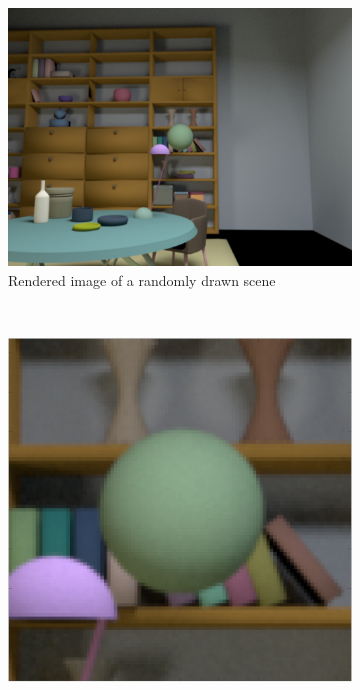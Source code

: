 \documentclass{jov}
\begin{document}
\begin{figure}
\centering
\begin{subfigure}[b]{0.25 \textwidth}
		\centering
        \includegraphics[width=\textwidth]{../Figures/Figure9/Figure9_a.png}
        \caption{Rendered image of a randomly drawn scene}
        \label{fig:3DScene}
    \end{subfigure}
    ~ %
    \begin{subfigure}[b]{0.19 \textwidth}   
    \hspace{0.1 \textwidth}
        \includegraphics[width=\textwidth]{../Figures/Figure9/Figure9_b.png}

\end{subfigure}
\end{figure}
\end{document}
